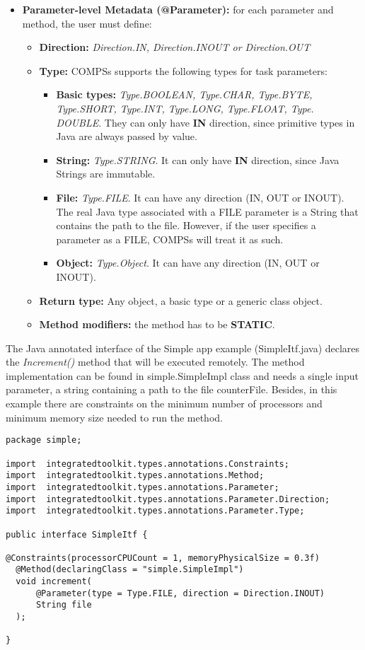 \begin{itemize}
 \item {\bf Parameter-level Metadata (@Parameter):} for each parameter and method, the user must define:
       \begin{itemize}
        \item {\bf Direction:} {\it Direction.IN, Direction.INOUT or Direction.OUT}
        \item {\bf Type:} COMPSs supports the following types for task parameters:
              \begin{itemize}
               \item {\bf Basic types:} {\it Type.BOOLEAN, Type.CHAR, Type.BYTE, Type.SHORT, Type.INT, Type.LONG,
                     Type.FLOAT, Type. DOUBLE}. They can only have {\bf IN} direction, since primitive types in Java are
                     always passed by value.
               \item {\bf String:} {\it Type.STRING}. It can only have {\bf IN} direction, since Java Strings are immutable.
               \item {\bf File:} {\it Type.FILE}. It can have any direction (IN, OUT or INOUT). The real Java type associated
                     with a FILE parameter is a String that contains the path to the file. However, if the user specifies
                     a parameter as a FILE, COMPSs will treat it as such.
               \item {\bf Object:} {\it Type.Object}. It can have any direction (IN, OUT or INOUT).
              \end{itemize}
        \item {\bf Return type:} Any object, a basic type or a generic class object.
        \item {\bf Method modifiers:} the method has to be {\bf STATIC}.
       \end{itemize}
\end{itemize}

    
The Java annotated interface of the Simple app example (SimpleItf.java) declares the {\it Increment()} method
that will be executed remotely. The method implementation can be found in simple.SimpleImpl class and
needs a single input parameter, a string containing a path to the file counterFile. Besides, in this example
there are constraints on the minimum number of processors and minimum memory size needed to run the
method.

\begin{lstlisting}
package simple;

import  integratedtoolkit.types.annotations.Constraints;
import  integratedtoolkit.types.annotations.Method;
import  integratedtoolkit.types.annotations.Parameter;
import  integratedtoolkit.types.annotations.Parameter.Direction;
import  integratedtoolkit.types.annotations.Parameter.Type;

public interface SimpleItf {

@Constraints(processorCPUCount = 1, memoryPhysicalSize = 0.3f)
  @Method(declaringClass = "simple.SimpleImpl")
  void increment(
      @Parameter(type = Type.FILE, direction = Direction.INOUT)
      String file
  );

}
\end{lstlisting}


